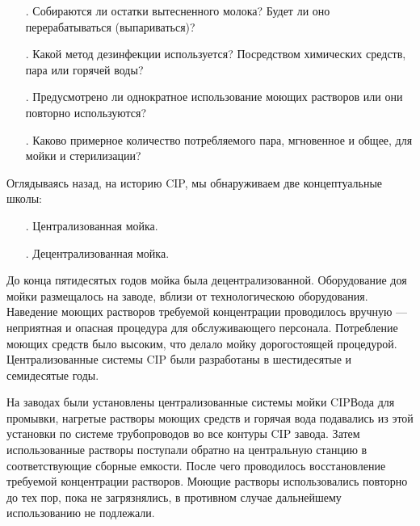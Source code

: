 {\begin{itemize}[leftmargin=2.15cm, labelwidth=0.65cm, labelsep=0.0cm]
	\item[\theitemcntr. ] Собираются ли остатки вытесненного молока? Будет ли оно перерабатываться (выпариваться)?
	\addtocounter{itemcntr}{1}
	
	\item[\theitemcntr. ] Какой метод дезинфекции используется? Посредством химических средств, пара или горячей воды?
	\addtocounter{itemcntr}{1}
	
	\item[\theitemcntr. ] Предусмотрено ли однократное использование моющих растворов или они повторно используются?
	\addtocounter{itemcntr}{1}
	
	\item[\theitemcntr. ] Каково примерное количество потребляемого пара, мгновенное и общее, для мойки и стерилизации?
	\addtocounter{itemcntr}{1}
	
	\setcounter{itemcntr}{1}
\end{itemize}

\par \redline Оглядываясь назад, на историю CIP, мы обнаруживаем две концептуальные школы:

\begin{itemize}[leftmargin=2.15cm, labelwidth=0.65cm, labelsep=0.0cm] 
	
	\item[\theitemcntr. ] Централизованная мойка.
	\addtocounter{itemcntr}{1}
	
	\item[\theitemcntr. ] Децентрализованная мойка.
	\addtocounter{itemcntr}{1}
	
	\addtocounter{itemcntr}{1}
	
	\setcounter{itemcntr}{1}
\end{itemize}

\par \redline До конца пятидесятых годов мойка была децентрализованной. Оборудование доя мойки размещалось на заводе, вблизи от технологическою оборудования. Наведение моющих растворов требуемой концентрации проводилось вручную — неприятная и опасная процедура для обслуживающего персонала. Потребление моющих средств было высоким, что делало мойку дорогостоящей процедурой.
Централизованные системы CIP были разработаны в шестидесятые и семидесятые годы.

\par \redline На заводах были установлены централизованные системы мойки CIPВода для промывки, нагретые растворы моющих средств и горячая вода подавались из этой установки по системе трубопроводов во все контуры CIP завода. Затем использованные растворы поступали обратно на центральную станцию в соответствующие сборные емкости. После чего проводилось восстановление требуемой концентрации растворов. Моющие растворы использовались повторно до тех пор, пока не загрязнялись, в противном случае дальнейшему использованию не подлежали.

}
